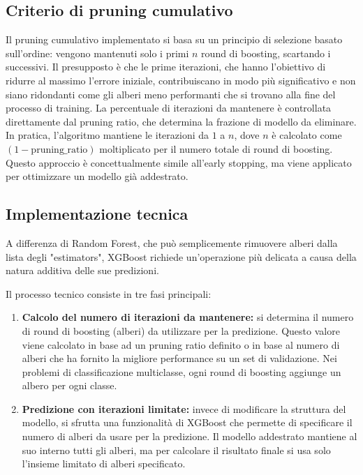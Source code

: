 \documentclass[a4paper,12pt]{report}
\begin{document}
	\subsection{Criterio di pruning cumulativo}
	Il pruning cumulativo implementato si basa su un principio di selezione basato sull'ordine: vengono mantenuti solo i primi $n$ round di boosting, scartando i successivi. Il presupposto è che le prime iterazioni, che hanno l'obiettivo di ridurre al massimo l'errore iniziale, contribuiscano in modo più significativo e non siano ridondanti come gli alberi meno performanti che si trovano alla fine del processo di training. La percentuale di iterazioni da mantenere è controllata direttamente dal pruning ratio, che determina la frazione di modello da eliminare. In pratica, l'algoritmo mantiene le iterazioni da $1$ a $n$, dove $n$ è calcolato come $(1 - \text{pruning\_ratio})$ moltiplicato per il numero totale di round di boosting. Questo approccio è concettualmente simile all'early stopping, ma viene applicato per ottimizzare un modello già addestrato.
	
	\subsection{Implementazione tecnica}
	A differenza di Random Forest, che può semplicemente rimuovere alberi dalla lista degli "estimators", XGBoost richiede un'operazione più delicata a causa della natura additiva delle sue predizioni.
	
	Il processo tecnico consiste in tre fasi principali:
	\begin{enumerate}
		\item \textbf{Calcolo del numero di iterazioni da mantenere:} si determina il numero di round di boosting (alberi) da utilizzare per la predizione. Questo valore viene calcolato in base ad un pruning ratio definito o in base al numero di alberi che ha fornito la migliore performance su un set di validazione. Nei problemi di classificazione multiclasse, ogni round di boosting aggiunge un albero per ogni classe.
		\item \textbf{Predizione con iterazioni limitate:} invece di modificare la struttura del modello, si sfrutta una funzionalità di XGBoost che permette di specificare il numero di alberi da usare per la predizione. Il modello addestrato mantiene al suo interno tutti gli alberi, ma per calcolare il risultato finale si usa solo l'insieme limitato di alberi specificato.
	\end{enumerate}
	
\end{document}
